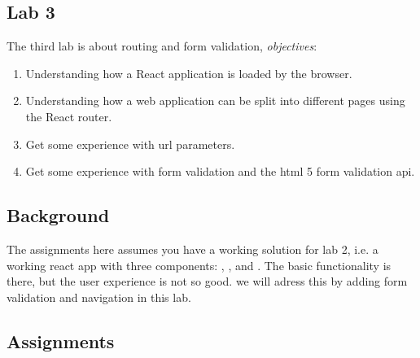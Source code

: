 \documentclass[fleqn, article, a4paper]{memoir}
\begin{document}
\maketitle
\thispagestyle{titlepage}
\vspace{-4cm}

\subsection*{Lab 3}

\n The third lab is about routing and form validation, \emph{objectives}:

\begin{enumerate}\firmlist
\item Understanding how a React application is loaded by the browser.
\item Understanding how a web application can be split into different pages using the React router.
\item Get some experience with url parameters.
\item Get some experience with form validation and the html 5 form validation api.
\end{enumerate}

\subsection*{Background}

The assignments here assumes you have a working solution for lab 2, i.e. a working react app with three components: , , and . The basic functionality is there, but the user experience is not so good. we will adress this by adding form validation and navigation in this lab.

\subsection*{Assignments}
\end{document}
